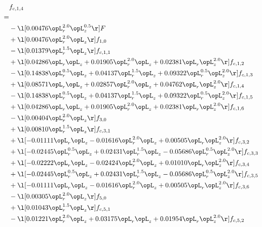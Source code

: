 \begin{alignat}{2} 
\label{eq:f_14_1} 
& f_{c,1,4} \nonumber \\ 
 = \\ 
& - \l[  0.00476 \opL_r^{2.0} \opL_z^{0.5}  \r] F \nonumber \\ 
& + \l[  0.00476 \opL_r^{2.0} \opL_z  \r] f_{1,0} \nonumber \\ 
& - \l[  0.01379 \opL_r^{1.5} \opL_z  \r] f_{c,1,1} \nonumber \\ 
& + \l[  0.04286 \opL_r \opL_z +  0.01905 \opL_r^{2.0} \opL_z +  0.02381 \opL_r \opL_z^{2.0}  \r] f_{c,1,2} \nonumber \\ 
& - \l[  0.14838 \opL_r^{0.5} \opL_z +  0.04137 \opL_r^{1.5} \opL_z +  0.09322 \opL_r^{0.5} \opL_z^{2.0}  \r] f_{c,1,3} \nonumber \\ 
& + \l[  0.08571 \opL_r \opL_z +  0.02857 \opL_r^{2.0} \opL_z +  0.04762 \opL_r \opL_z^{2.0}  \r] f_{c,1,4} \nonumber \\ 
& - \l[  0.14838 \opL_r^{0.5} \opL_z +  0.04137 \opL_r^{1.5} \opL_z +  0.09322 \opL_r^{0.5} \opL_z^{2.0}  \r] f_{c,1,5} \nonumber \\ 
& + \l[  0.04286 \opL_r \opL_z +  0.01905 \opL_r^{2.0} \opL_z +  0.02381 \opL_r \opL_z^{2.0}  \r] f_{c,1,6} \nonumber \\ 
& - \l[  0.00404 \opL_r^{2.0} \opL_z  \r] f_{3,0} \nonumber \\ 
& + \l[  0.00810 \opL_r^{1.5} \opL_z  \r] f_{c,3,1} \nonumber \\ 
& + \l[  -0.01111 \opL_r \opL_z   -0.01616 \opL_r^{2.0} \opL_z +  0.00505 \opL_r \opL_z^{2.0}  \r] f_{c,3,2} \nonumber \\ 
& + \l[  -0.02445 \opL_r^{0.5} \opL_z +  0.02431 \opL_r^{1.5} \opL_z   -0.05686 \opL_r^{0.5} \opL_z^{2.0}  \r] f_{c,3,3} \nonumber \\ 
& + \l[  -0.02222 \opL_r \opL_z   -0.02424 \opL_r^{2.0} \opL_z +  0.01010 \opL_r \opL_z^{2.0}  \r] f_{c,3,4} \nonumber \\ 
& + \l[  -0.02445 \opL_r^{0.5} \opL_z +  0.02431 \opL_r^{1.5} \opL_z   -0.05686 \opL_r^{0.5} \opL_z^{2.0}  \r] f_{c,3,5} \nonumber \\ 
& + \l[  -0.01111 \opL_r \opL_z   -0.01616 \opL_r^{2.0} \opL_z +  0.00505 \opL_r \opL_z^{2.0}  \r] f_{c,3,6} \nonumber \\ 
& - \l[  0.00305 \opL_r^{2.0} \opL_z  \r] f_{5,0} \nonumber \\ 
& + \l[  0.01043 \opL_r^{1.5} \opL_z  \r] f_{c,5,1} \nonumber \\ 
& - \l[  0.01221 \opL_r^{2.0} \opL_z +  0.03175 \opL_r \opL_z +  0.01954 \opL_r \opL_z^{2.0}  \r] f_{c,5,2} \nonumber \\ 

\end{alignat}
